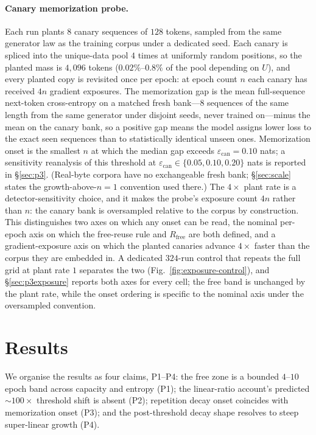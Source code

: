 \documentclass[11pt]{article}
\begin{document}
\paragraph{Canary memorization probe.}
Each run plants $8$ canary sequences of $128$ tokens, sampled from the same
generator law as the training corpus under a dedicated seed. Each canary is spliced
into the unique-data pool $4$ times at uniformly random positions, so the planted
mass is $4{,}096$ tokens ($0.02\%$--$0.8\%$ of the pool depending on $U$), and every
planted copy is revisited once per epoch: at epoch count $n$ each canary has
received $4n$ gradient exposures. The memorization gap is the mean full-sequence
next-token cross-entropy on a matched fresh bank---$8$ sequences of the same length
from the same generator under disjoint seeds, never trained on---minus the mean on
the canary bank, so a positive gap means the model assigns lower loss to the exact
seen sequences than to statistically identical unseen ones. Memorization onset is
the smallest $n$ at which the median gap exceeds
$\varepsilon_{\mathrm{can}} = 0.10$ nats; a sensitivity reanalysis of this
threshold at $\varepsilon_{\mathrm{can}} \in \{0.05, 0.10, 0.20\}$ nats is
reported in \S\ref{sec:p3}. (Real-byte corpora have no exchangeable
fresh bank; \S\ref{sec:scale} states the growth-above-$n{=}1$ convention used
there.)
The $4\times$ plant rate is a detector-sensitivity choice, and it makes the probe's
exposure count $4n$ rather than $n$: the canary bank is oversampled relative to the
corpus by construction. This distinguishes two axes on which any onset can be read,
the nominal per-epoch axis on which the free-reuse rule and $R_{\mathrm{free}}$ are
both defined, and a gradient-exposure axis on which the planted canaries advance
$4\times$ faster than the corpus they are embedded in. A dedicated $324$-run control
that repeats the full grid at plant rate $1$ separates the two
(Fig.~\ref{fig:exposure-control}), and
\S\ref{sec:p3exposure} reports both axes for every cell; the free band is unchanged
by the plant rate, while the onset ordering is specific to the nominal axis under
the oversampled convention.

\section{Results}\label{sec:results}

We organise the results as four claims, P1--P4: the free zone is a bounded $4$--$10$
epoch band across capacity and entropy (P1); the linear-ratio account's predicted
${\sim}100\times$ threshold shift is absent (P2); repetition decay onset coincides with
memorization onset (P3);
and the post-threshold decay shape resolves to steep super-linear growth (P4).
\end{document}
